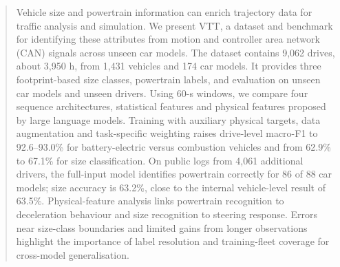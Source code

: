 \begin{abstract}
Vehicle size and powertrain information can enrich trajectory data for traffic analysis and simulation. We present VTT, a dataset and benchmark for identifying these attributes from motion and controller area network (CAN) signals across unseen car models. The dataset contains 9,062 drives, about 3,950 h, from 1,431 vehicles and 174 car models. It provides three footprint-based size classes, powertrain labels, and evaluation on unseen car models and unseen drivers. Using 60-s windows, we compare four sequence architectures, statistical features and physical features proposed by large language models. Training with auxiliary physical targets, data augmentation and task-specific weighting raises drive-level macro-F1 to 92.6--93.0\% for battery-electric versus combustion vehicles and from 62.9\% to 67.1\% for size classification. On public logs from 4,061 additional drivers, the full-input model identifies powertrain correctly for 86 of 88 car models; size accuracy is 63.2\%, close to the internal vehicle-level result of 63.5\%. Physical-feature analysis links powertrain recognition to deceleration behaviour and size recognition to steering response. Errors near size-class boundaries and limited gains from longer observations highlight the importance of label resolution and training-fleet coverage for cross-model generalisation.
\end{abstract}
